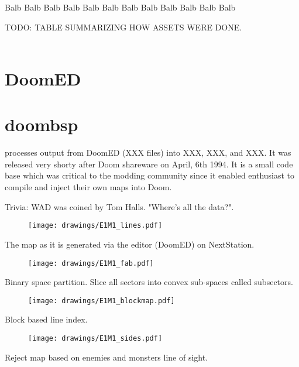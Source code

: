 
Balb Balb Balb Balb Balb Balb Balb Balb Balb Balb Balb Balb \\
\par
{}
TODO: TABLE SUMMARIZING HOW ASSETS WERE DONE.\\
\\


\section{DoomED}
\par
{}
\par
{}
\par
{}
\par
{}
\par
\section{doombsp}
 processes output from DoomED (XXX files) into XXX, XXX, and XXX. It was released very shorty after Doom shareware on April, 6th 1994. It is a small code base which was critical to the modding community since it enabled enthusiast to compile and inject their own maps into Doom.\\
\par
{}
\par
Trivia: WAD was coined by Tom Halls. "Where's all the data?".\\
\par

\par
\begin{figure}[H]
\centering
\texttt{[image: drawings/E1M1\_lines.pdf]}
\end{figure}
\par
The map as it is generated via the editor (DoomED) on NextStation.\\
\par
\begin{figure}[H]
\centering
\texttt{[image: drawings/E1M1\_fab.pdf]}
\end{figure}
\par
Binary space partition. Slice all sectors into convex sub-spaces called subsectors.\\
\par
\begin{figure}[H]
\centering
\texttt{[image: drawings/E1M1\_blockmap.pdf]}
\end{figure}
\par
Block based line index.\\
\par
\begin{figure}[H]
\centering
\texttt{[image: drawings/E1M1\_sides.pdf]}
\end{figure}
\par
Reject map based on enemies and monsters line of sight.\\

